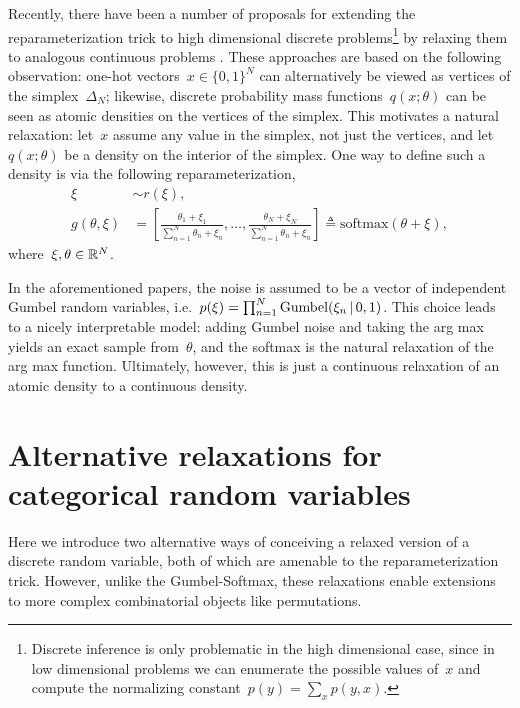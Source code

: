 Recently, there have been a number of proposals for extending the
reparameterization trick to high dimensional discrete
problems\footnote{Discrete inference is only problematic in the high
  dimensional case, since in low dimensional problems we can enumerate
  the possible values of~$x$ and compute the normalizing
  constant~$p(y) = \sum_x p(y, x)$.} by relaxing them to analogous
continuous problems \citep{maddison2016concrete, jang2016categorical,
  kusner2016gans}.  These approaches are based on the following
observation: one-hot vectors~$x \in \{0,1\}^N$ can alternatively be
viewed as vertices of the simplex~$\Delta_N$; likewise, discrete
probability mass functions~$q(x; \theta)$ can be seen as atomic
densities on the vertices of the simplex.  This motivates a natural
relaxation: let~$x$ assume any value in the simplex, not just the
vertices, and let~$q(x; \theta)$ be a density on the interior of the
simplex.  One way to define such a density is via the following
reparameterization,
\begin{align}
  \xi &\sim r(\xi), \\
  g(\theta, \xi) &= \left[ \frac{\theta_1 + \xi_1}{\sum_{n=1}^N \theta_n + \xi_n},
      \ldots,
      \frac{\theta_N + \xi_N}{\sum_{n=1}^N \theta_n + \xi_n}
      \right]
    \triangleq \mathrm{softmax}(\theta + \xi),
\end{align}
where~${\xi, \theta \in \mathbb{R}^N}$.  

In the aforementioned papers, the noise is assumed to be a vector of
independent Gumbel random variables,
i.e.~${p(\xi) = \prod_{n=1}^N \mathrm{Gumbel}(\xi_n \, | \, 0, 1)}$.
This choice leads to a nicely interpretable model: adding Gumbel noise
and taking the arg max yields an exact sample from~$\theta$, and
the softmax is the natural relaxation of the arg max function. Ultimately,
however, this is just a continuous relaxation of an atomic density to
a continuous density.

\section{Alternative relaxations for categorical random variables}
\label{sec:alternative}
Here we introduce two alternative ways of conceiving a relaxed version
of a discrete random variable, both of which are amenable to the
reparameterization trick. However, unlike the Gumbel-Softmax, these
relaxations enable extensions to more complex combinatorial objects
like permutations.

